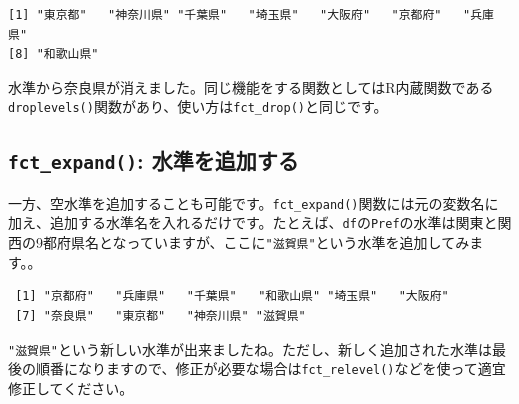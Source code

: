 \documentclass[
  a4paper,
  pandoc,
  ja=standard,
  jafont=haranoaji]{bxjsbook}
\newenvironment{Shaded}{\begin{snugshade}}{\end{snugshade}}
\newcommand{\AttributeTok}[1]{\textcolor[rgb]{0.00,0.48,0.65}{#1}}
\newcommand{\FunctionTok}[1]{\textcolor[rgb]{0.28,0.35,0.67}{#1}}
\newcommand{\NormalTok}[1]{\textcolor[rgb]{0.00,0.48,0.65}{#1}}
\newcommand{\OtherTok}[1]{\textcolor[rgb]{0.00,0.48,0.65}{#1}}
\newcommand{\SpecialCharTok}[1]{\textcolor[rgb]{0.37,0.37,0.37}{#1}}
\newcommand{\StringTok}[1]{\textcolor[rgb]{0.13,0.47,0.30}{#1}}
\begin{document}
\begin{Shaded}
\end{Shaded}

\begin{verbatim}
[1] "東京都"   "神奈川県" "千葉県"   "埼玉県"   "大阪府"   "京都府"   "兵庫県"  
[8] "和歌山県"
\end{verbatim}

水準から奈良県が消えました。同じ機能をする関数としてはR内蔵関数である\texttt{droplevels()}関数があり、使い方は\texttt{fct\_drop()}と同じです。

\hypertarget{fct_expand-ux6c34ux6e96ux3092ux8ffdux52a0ux3059ux308b}{%
\subsection{\texorpdfstring{\texttt{fct\_expand()}:
水準を追加する}{fct\_expand(): 水準を追加する}}\label{fct_expand-ux6c34ux6e96ux3092ux8ffdux52a0ux3059ux308b}}

一方、空水準を追加することも可能です。\texttt{fct\_expand()}関数には元の変数名に加え、追加する水準名を入れるだけです。たとえば、\texttt{df}の\texttt{Pref}の水準は関東と関西の9都府県名となっていますが、ここに\texttt{"滋賀県"}という水準を追加してみます。。

\begin{Shaded}
\end{Shaded}

\begin{verbatim}
 [1] "京都府"   "兵庫県"   "千葉県"   "和歌山県" "埼玉県"   "大阪府"  
 [7] "奈良県"   "東京都"   "神奈川県" "滋賀県"  
\end{verbatim}

\texttt{"滋賀県"}という新しい水準が出来ましたね。ただし、新しく追加された水準は最後の順番になりますので、修正が必要な場合は\texttt{fct\_relevel()}などを使って適宜修正してください。
\end{document}
